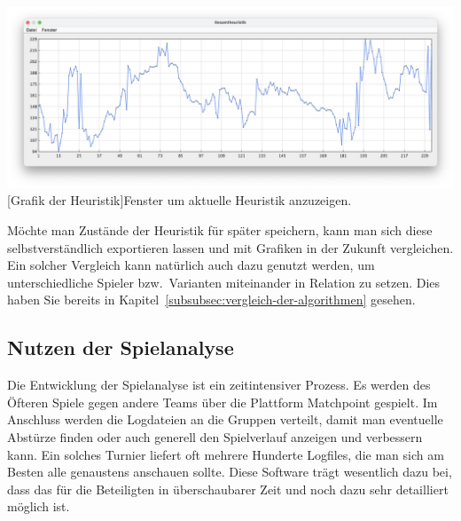 \vspace{1em}
\begin{minipage}{\linewidth}
    \centering
    \includegraphics[width=0.8\linewidth]{pics/heuristic}
    [Grafik der Heuristik]{Fenster um aktuelle Heuristik anzuzeigen.}
    \label{fig:heuristic}
\end{minipage}

M\"ochte man Zust\"ande der Heuristik f\"ur sp\"ater speichern, kann man sich diese selbstverst\"andlich exportieren lassen und mit Grafiken in der Zukunft vergleichen.
Ein solcher Vergleich kann nat\"urlich auch dazu genutzt werden, um unterschiedliche Spieler bzw.\ Varianten miteinander in Relation zu setzen.
Dies haben Sie bereits in Kapitel~\ref{subsubsec:vergleich-der-algorithmen} gesehen.

\subsection{Nutzen der Spielanalyse}\label{subsec:nutzen-der-spielanalyse}
Die Entwicklung der Spielanalyse ist ein zeitintensiver Prozess.
Es werden des \"Ofteren Spiele gegen andere Teams \"uber die Plattform Matchpoint gespielt.
Im Anschluss werden die Logdateien an die Gruppen verteilt, damit man eventuelle Abst\"urze finden oder auch generell den Spielverlauf anzeigen und verbessern kann.
Ein solches Turnier liefert oft mehrere Hunderte Logfiles, die man sich am Besten alle genaustens anschauen sollte.
Diese Software tr\"agt wesentlich dazu bei, dass das f\"ur die Beteiligten in \"uberschaubarer Zeit und noch dazu sehr detailliert m\"oglich ist.


\bigskip
\newpage